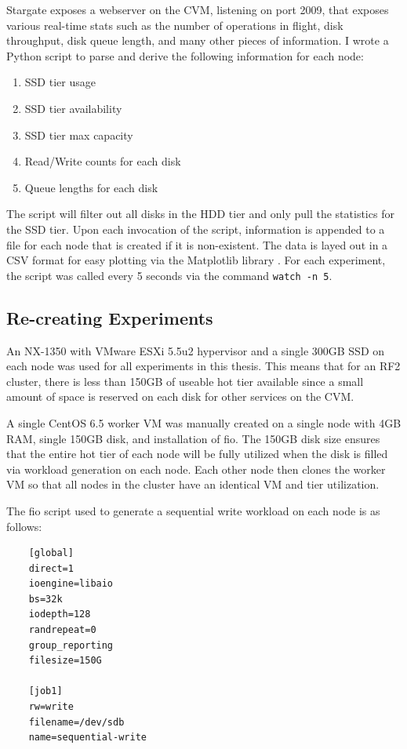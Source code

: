 \documentclass[12pt]{article}
\begin{document}
  Stargate exposes a webserver on the CVM, listening on port 2009, that exposes
  various real-time stats such as the number of operations in flight, disk
  throughput, disk queue length, and many other pieces of information. I wrote
  a Python script to parse and derive the following information for each node:

  \begin{enumerate}
    \item SSD tier usage
    \item SSD tier availability
    \item SSD tier max capacity
    \item Read/Write counts for each disk
    \item Queue lengths for each disk
  \end{enumerate}

  The script will filter out all disks in the HDD tier and only pull the
  statistics for the SSD tier. Upon each invocation of the script, information
  is appended to a file for each node that is created if it is non-existent.
  The data is layed out in a CSV format for easy plotting via the Matplotlib
  library \cite{matplotlib}. For each experiment, the script was called every 5
  seconds via the command \verb|watch -n 5|.

  \subsection{Re-creating Experiments}

  An NX-1350 with VMware ESXi 5.5u2 hypervisor and a single 300GB SSD on each
  node was used for all experiments in this thesis. This means that for an RF2
  cluster, there is less than 150GB of useable hot tier available since a small
  amount of space is reserved on each disk for other services on the CVM.

  A single CentOS 6.5 worker VM was manually created on a single node with 4GB
  RAM, single 150GB disk, and installation of fio. The 150GB disk size ensures
  that the entire hot tier of each node will be fully utilized when the disk is
  filled via workload generation on each node. Each other node then clones the
  worker VM so that all nodes in the cluster have an identical VM and tier
  utilization.

  The fio script used to generate a sequential write workload on each node is
  as follows:
  
  \begin{verbatim}
    [global]
    direct=1
    ioengine=libaio
    bs=32k
    iodepth=128
    randrepeat=0
    group_reporting
    filesize=150G

    [job1]
    rw=write
    filename=/dev/sdb
    name=sequential-write
  \end{verbatim}
\end{document}
